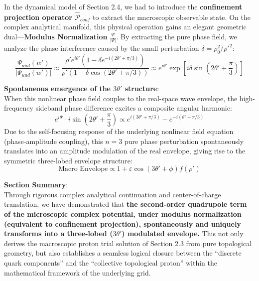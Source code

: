 \documentclass[12pt, a4paper]{article}
\begin{document}
In the dynamical model of Section 2.4, we had to introduce the \textbf{confinement projection operator $\hat{\mathcal{P}}_{conf}$} to extract the macroscopic observable state. On the complex analytical manifold, this physical operation gains an elegant geometric dual—\textbf{Modulus Normalization} $\frac{\Psi}{|\Psi|}$.  
By extracting the pure phase field, we analyze the phase interference caused by the small perturbation $\delta = \rho_0^2 / \rho'^2$:
\begin{equation}
\frac{\Psi_{uud}(w')}{\left| \Psi_{uud}(w') \right|} \approx \frac{\rho' e^{i\theta'} \left( 1 - \delta e^{-i(2\theta' + \pi/3)} \right)}{\rho' \left( 1 - \delta \cos(2\theta' + \pi/3) \right)} \approx e^{i\theta'} \exp\left[ i \delta \sin\left(2\theta' + \frac{\pi}{3}\right) \right] \label{eq:modulus_norm}
\end{equation}

\textbf{Spontaneous emergence of the $3\theta'$ structure}: \\
When this nonlinear phase field couples to the real-space wave envelope, the high-frequency sideband phase difference excites a composite angular harmonic:
\begin{equation}
e^{i\theta'} \cdot i \sin\left(2\theta' + \frac{\pi}{3}\right) \propto e^{i(3\theta' + \pi/3)} - e^{-i(\theta' + \pi/3)} \label{eq:harmonic_emergence}
\end{equation}
Due to the self-focusing response of the underlying nonlinear field equation (phase-amplitude coupling), this $n=3$ pure phase perturbation spontaneously translates into an amplitude modulation of the real envelope, giving rise to the symmetric three-lobed envelope structure:
\begin{equation}
\text{Macro Envelope} \propto 1 + \varepsilon \cos(3\theta' + \phi) f(\rho') \label{eq:envelope_final_emerge}
\end{equation}

\textbf{Section Summary}: \\
Through rigorous complex analytical continuation and center-of-charge translation, we have demonstrated that \textbf{the second-order quadrupole term of the microscopic complex potential, under modulus normalization (equivalent to confinement projection), spontaneously and uniquely transforms into a three-lobed ($3\theta'$) modulated envelope.} This not only derives the macroscopic proton trial solution of Section 2.3 from pure topological geometry, but also establishes a seamless logical closure between the ``discrete quark components'' and the ``collective topological proton'' within the mathematical framework of the underlying grid.
\end{document}
